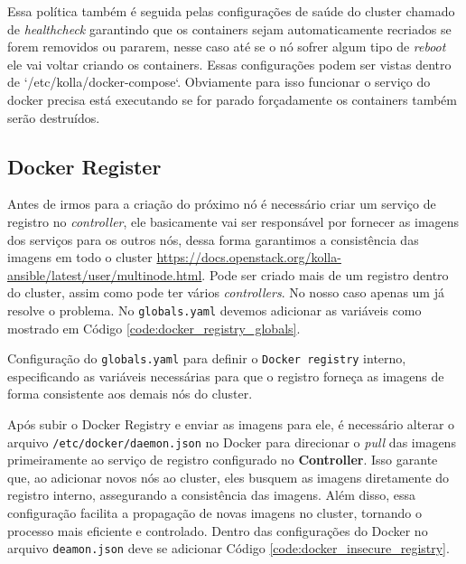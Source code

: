 Essa política também é seguida pelas configurações de saúde do cluster chamado de \textit{healthcheck} garantindo que os containers sejam automaticamente recriados se forem removidos ou pararem, nesse caso até se o nó sofrer algum tipo de \textit{reboot} ele vai voltar criando os containers. Essas configurações podem ser vistas dentro de `/etc/kolla/docker-compose`. Obviamente para isso funcionar o serviço do docker precisa está executando se for parado forçadamente os containers também serão destruídos.

\subsection{Docker Register}
Antes de irmos para a criação do próximo nó é necessário criar um serviço de registro no \textit{controller}, ele basicamente vai ser responsável por fornecer as imagens dos serviços para os outros nós, dessa forma garantimos a consistência das imagens em todo o cluster \url{https://docs.openstack.org/kolla-ansible/latest/user/multinode.html}. Pode ser criado mais de um registro dentro do cluster, assim como pode ter vários \textit{controllers}. No nosso caso apenas um já resolve o problema. No \texttt{globals.yaml} devemos adicionar as variáveis como mostrado em Código \ref{code:docker_registry_globals}.

\begin{listing}[h!]
    \noindent{}  
  \caption{Configuração do \texttt{globals.yaml} para definir o \texttt{Docker registry} interno, especificando as variáveis necessárias para que o registro forneça as imagens de forma consistente aos demais nós do cluster.}
  \label{code:docker_registry_globals}
\end{listing}


Após subir o Docker Registry e enviar as imagens para ele, é necessário alterar o arquivo \texttt{/etc/docker/daemon.json} no Docker para direcionar o \textit{pull} das imagens primeiramente ao serviço de registro configurado no \textbf{Controller}. Isso garante que, ao adicionar novos nós ao cluster, eles busquem as imagens diretamente do registro interno, assegurando a consistência das imagens. Além disso, essa configuração facilita a propagação de novas imagens no cluster, tornando o processo mais eficiente e controlado. Dentro das configurações do Docker no arquivo \texttt{deamon.json} deve se adicionar Código \ref{code:docker_insecure_registry}.


